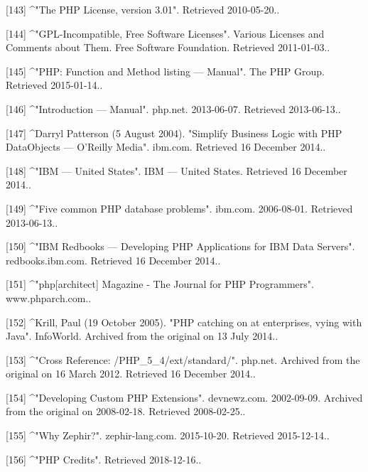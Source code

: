 [143]
^"The PHP License, version 3.01". Retrieved 2010-05-20..

[144]
^"GPL-Incompatible, Free Software Licenses". Various Licenses and Comments about Them. Free Software Foundation. Retrieved 2011-01-03..

[145]
^"PHP: Function and Method listing — Manual". The PHP Group. Retrieved 2015-01-14..

[146]
^"Introduction — Manual". php.net. 2013-06-07. Retrieved 2013-06-13..

[147]
^Darryl Patterson (5 August 2004). "Simplify Business Logic with PHP DataObjects — O'Reilly Media". ibm.com. Retrieved 16 December 2014..

[148]
^"IBM — United States". IBM — United States. Retrieved 16 December 2014..

[149]
^"Five common PHP database problems". ibm.com. 2006-08-01. Retrieved 2013-06-13..

[150]
^"IBM Redbooks — Developing PHP Applications for IBM Data Servers". redbooks.ibm.com. Retrieved 16 December 2014..

[151]
^"php[architect] Magazine - The Journal for PHP Programmers". www.phparch.com..

[152]
^Krill, Paul (19 October 2005). "PHP catching on at enterprises, vying with Java". InfoWorld. Archived from the original on 13 July 2014..

[153]
^"Cross Reference: /PHP_5_4/ext/standard/". php.net. Archived from the original on 16 March 2012. Retrieved 16 December 2014..

[154]
^"Developing Custom PHP Extensions". devnewz.com. 2002-09-09. Archived from the original on 2008-02-18. Retrieved 2008-02-25..

[155]
^"Why Zephir?". zephir-lang.com. 2015-10-20. Retrieved 2015-12-14..

[156]
^"PHP Credits". Retrieved 2018-12-16..

